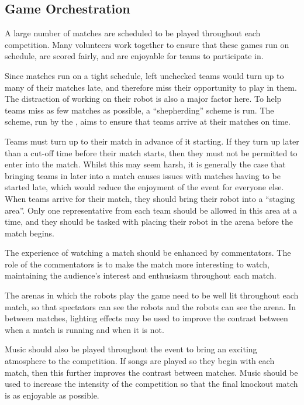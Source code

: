 \subsection{Game Orchestration}

A large number of matches are scheduled to be played throughout each competition.  Many volunteers work together to ensure that these games run on schedule, are scored fairly, and are enjoyable for teams to participate in.

Since matches run on a tight schedule, left unchecked teams would turn up to many of their matches late, and therefore miss their opportunity to play in them.  The distraction of working on their robot is also a major factor here.  To help teams miss as few matches as possible, a ``shepherding'' scheme is run.  The scheme, run by the , aims to ensure that teams arrive at their matches on time.

Teams must turn up to their match in advance of it starting.  If they turn up later than a cut-off time before their match starts, then they must not be permitted to enter into the match.  Whilst this may seem harsh, it is generally the case that bringing teams in later into a match causes issues with matches having to be started late, which would reduce the enjoyment of the event for everyone else.  When teams arrive for their match, they should bring their robot into a ``staging area''.  Only one representative from each team should be allowed in this area at a time, and they should be tasked with placing their robot in the arena before the match begins.

The experience of watching a match should be enhanced by commentators.  The role of the commentators is to make the match more interesting to watch, maintaining the audience's interest and enthusiasm throughout each match.

The arenas in which the robots play the game need to be well lit throughout each match, so that spectators can see the robots and the robots can see the arena.  In between matches, lighting effects may be used to improve the contrast between when a match is running and when it is not.

Music should also be played throughout the event to bring an exciting atmosphere to the competition.  If songs are played so they begin with each match, then this further improves the contrast between matches.  Music should be used to increase the intensity of the competition so that the final knockout match is as enjoyable as possible.

